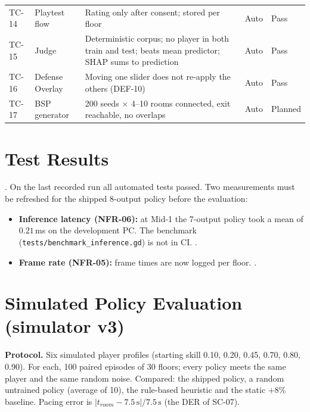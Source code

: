 \begin{table}[!htbp]
\begin{tabular}{p{}p{}p{}p{}p{}}
TC-14 & Playtest flow & Rating only after consent; stored per floor & Auto & Pass \\
TC-15 & Judge & Deterministic corpus; no player in both train and test; beats mean predictor; SHAP sums to prediction & Auto & Pass \\
TC-16 & Defense Overlay & Moving one slider does not re-apply the others (DEF-10) & Auto & Pass \\
TC-17 & BSP generator & 200 seeds $\times$ 4--10 rooms connected, exit reachable, no overlaps & Auto & Planned \\
\bottomrule
\end{tabular}
\end{table}

\section{Test Results}
. On the last recorded run all automated tests passed. Two measurements must be refreshed for the shipped 8-output policy before the evaluation:
\begin{itemize}
    \item \textbf{Inference latency (NFR-06):} at Mid-1 the 7-output policy took a mean of $0.21$\,ms on the development PC. The benchmark (\texttt{tests/benchmark\_inference.gd}) is not in CI. .
    \item \textbf{Frame rate (NFR-05):} frame times are now logged per floor. .
\end{itemize}

\section{Simulated Policy Evaluation (simulator v3)}
\label{sec:sim_results}\label{sec:policy_eval}
\textbf{Protocol.} Six simulated player profiles (starting skill 0.10, 0.20, 0.45, 0.70, 0.80, 0.90). For each, 100 paired episodes of 30 floors; every policy meets the same player and the same random noise. Compared: the shipped policy, a random untrained policy (average of 10), the rule-based heuristic and the static $+8\%$ baseline. Pacing error is $|t_{room} - 7.5\,\text{s}| / 7.5\,\text{s}$ (the DER of SC-07).


